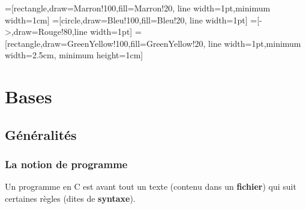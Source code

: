 
=[rectangle,draw=Marron!100,fill=Marron!20,
    line width=1pt,minimum width=1cm]
=[circle,draw=Bleu!100,fill=Bleu!20,
    line width=1pt]
=[->,draw=Rouge!80,line width=1pt]
=[rectangle,draw=GreenYellow!100,fill=GreenYellow!20,
    line width=1pt,minimum width=2.5cm, minimum height=1cm]

\section{Bases}

\subsection{Généralités}

\begin{frame} \frametitle{La notion de programme}
Un \alert{programme} en {\sf C} est avant tout un texte (contenu
dans un {\bf fichier}) qui suit certaines règles (dites de {\bf syntaxe}).
\bigskip
\bigskip


\end{frame}

